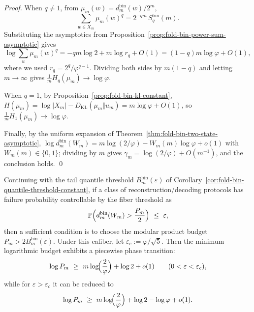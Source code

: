 \begin{proof}
When \(q\neq 1\), from \(\mu_m(w)=d^{\mathrm{bin}}_m(w)/2^m\),
\[
\sum_{w\in X_m}\mu_m(w)^q
=2^{-qm}\,S_q^{\mathrm{bin}}(m).
\]
Substituting the asymptotics from Proposition~\ref{prop:fold-bin-power-sum-asymptotic} gives
\[
\log\sum_{w}\mu_m(w)^q
=-qm\log 2 + m\log r_q + O(1)
=(1-q)m\log\varphi+O(1),
\]
where we used \(r_q=2^q/\varphi^{q-1}\).
Dividing both sides by \(m(1-q)\) and letting \(m\to\infty\) gives \(\frac{1}{m}H_q(\mu_m)\to\log\varphi\).
\par
When \(q=1\), by Proposition~\ref{prop:fold-bin-kl-constant},
\(
H(\mu_m)=\log|X_m|-D_{\mathrm{KL}}(\mu_m\Vert u_m)
=m\log\varphi+O(1)
\),
so \(\frac{1}{m}H_1(\mu_m)\to\log\varphi\).
\par
Finally, by the uniform expansion of Theorem~\ref{thm:fold-bin-two-state-asymptotic},
\(
\log d^{\mathrm{bin}}_m(W_m)=m\log(2/\varphi)-W_m(m)\log\varphi+o(1)
\)
with \(W_m(m)\in\{0,1\}\); dividing by \(m\) gives
\(
\gamma_m=\log(2/\varphi)+O(m^{-1})
\), and the conclusion holds. \qed
\end{proof}

\begin{corollary}[Phase transition in the reconstruction budget: \texorpdfstring{$\log\varphi$}{log phi}-order savings at the threshold \texorpdfstring{$\varepsilon_c=\varphi/\sqrt5$}{epsc=phi/sqrt5}]\label{cor:fold-bin-budget-phase-transition}
Continuing with the tail quantile threshold \(B^{\mathrm{bin}}_m(\varepsilon)\) of Corollary~\ref{cor:fold-bin-quantile-threshold-constant},
if a class of reconstruction/decoding protocols has failure probability controllable by the fiber threshold as
\[
\mathbb{P}\Bigl(d^{\mathrm{bin}}_m(W_m)>\frac{P_m}{2}\Bigr)\ \le\ \varepsilon,
\]
then a sufficient condition is to choose the modular product budget \(P_m>2B^{\mathrm{bin}}_m(\varepsilon)\).
Under this caliber, let \(\varepsilon_c:=\varphi/\sqrt5\).
Then the minimum logarithmic budget exhibits a piecewise phase transition:
\[
\log P_m\ \ge\ m\log\!\Bigl(\frac{2}{\varphi}\Bigr)+\log 2+o(1)\qquad(0<\varepsilon<\varepsilon_c),
\]
while for \(\varepsilon>\varepsilon_c\) it can be reduced to
\[
\log P_m\ \ge\ m\log\!\Bigl(\frac{2}{\varphi}\Bigr)+\log 2-\log\varphi+o(1).
\]
\end{corollary}

